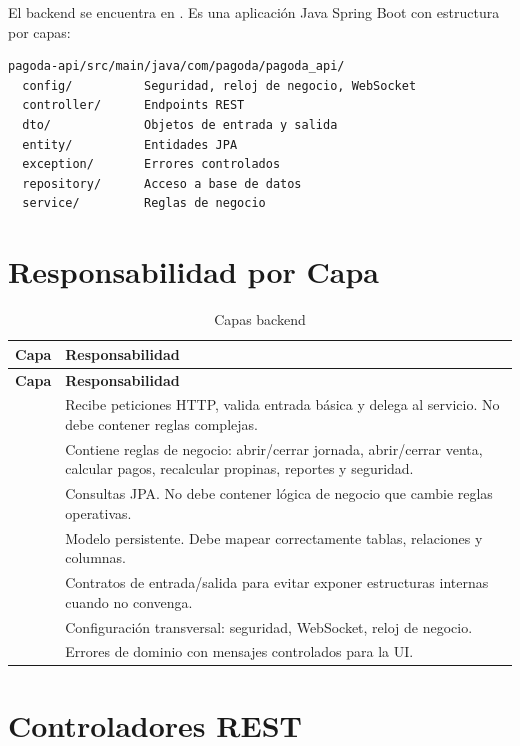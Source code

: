 \documentclass[11pt,letterpaper,openany]{report}
\newcommand{\code}[1]{\texttt{\detokenize{#1}}}
\begin{document}
El backend se encuentra en \code{pagoda-api}. Es una aplicación Java Spring Boot con estructura por capas:

\begin{lstlisting}
pagoda-api/src/main/java/com/pagoda/pagoda_api/
  config/          Seguridad, reloj de negocio, WebSocket
  controller/      Endpoints REST
  dto/             Objetos de entrada y salida
  entity/          Entidades JPA
  exception/       Errores controlados
  repository/      Acceso a base de datos
  service/         Reglas de negocio
\end{lstlisting}

\section{Responsabilidad por Capa}

\begin{longtable}{p{}p{}}
\caption{Capas backend}\\
\toprule
\textbf{Capa} & \textbf{Responsabilidad}\\
\midrule
\endfirsthead
\toprule
\textbf{Capa} & \textbf{Responsabilidad}\\
\midrule
\endhead
\code{controller} & Recibe peticiones HTTP, valida entrada básica y delega al servicio. No debe contener reglas complejas.\\
\code{service} & Contiene reglas de negocio: abrir/cerrar jornada, abrir/cerrar venta, calcular pagos, recalcular propinas, reportes y seguridad.\\
\code{repository} & Consultas JPA. No debe contener lógica de negocio que cambie reglas operativas.\\
\code{entity} & Modelo persistente. Debe mapear correctamente tablas, relaciones y columnas.\\
\code{dto} & Contratos de entrada/salida para evitar exponer estructuras internas cuando no convenga.\\
\code{config} & Configuración transversal: seguridad, WebSocket, reloj de negocio.\\
\code{exception} & Errores de dominio con mensajes controlados para la UI.\\
\bottomrule
\end{longtable}

\section{Controladores REST}
\end{document}

